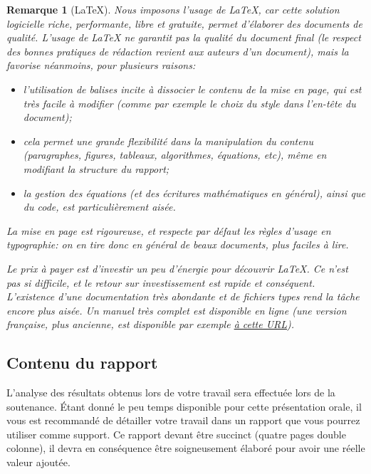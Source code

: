 \documentclass[twocolumn,10pt]{article}
\newtheorem{remarque}{Remarque}
\begin{document}
\begin{remarque}[\LaTeX{}]
Nous imposons l'usage de \LaTeX{}, car cette solution logicielle riche, performante, libre et gratuite, permet d'élaborer des documents de qualité. L'usage de \LaTeX{} ne garantit pas la qualité du document final (le respect des bonnes pratiques de rédaction revient aux auteurs d'un document), mais la favorise néanmoins, pour plusieurs raisons: 
\begin{itemize}
\item l'utilisation de balises incite à dissocier le contenu de la mise en page, qui est très facile à modifier (comme par exemple le choix du style  dans l'en-tête du document); 
\item cela permet une grande flexibilité dans la manipulation du contenu (paragraphes, figures, tableaux, algorithmes, équations, etc), même en modifiant la structure du rapport; 
\item la gestion des équations (et des écritures mathématiques en général), ainsi que du code, est particulièrement aisée. 
\end{itemize}
La mise en page est rigoureuse, et respecte par défaut les règles d'usage en typographie: on en tire donc en général de beaux documents, plus faciles à lire. 

Le prix à payer est d'investir un peu d'énergie pour découvrir \LaTeX{}. Ce n'est pas si difficile, et le retour sur investissement est rapide et conséquent. L'existence d'une documentation très abondante et de fichiers types rend la tâche encore plus aisée. Un manuel très complet est disponible en ligne \cite{oetiker18} (une version française, plus ancienne, est disponible par exemple \href{https://ctan.org/tex-archive/info/lshort/french}{à cette URL}). 
\end{remarque}



\subsection{Contenu du rapport}\label{subsec:CR:contenu}

L'analyse des résultats obtenus lors de votre travail sera effectuée lors de la soutenance. \'Etant donné le peu temps disponible pour cette présentation orale, il vous est recommandé de détailler votre travail dans un rapport que vous pourrez utiliser comme support. Ce rapport devant être succinct (quatre pages double colonne), il devra en conséquence être soigneusement élaboré pour avoir une réelle valeur ajoutée. 
\end{document}
